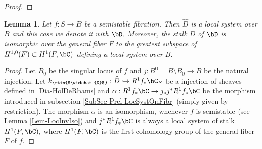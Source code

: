 \documentclass[a4paper,11pt]{amsart}
\newtheorem{lemma}[theorem]{Lemma}
\begin{document}
{\begin{proof}
	\end{proof}	
	\begin{lemma}\label{Lem-cDLocSys} Let $f:S\to B$ be a semistable fibration. Then $\widehat{D}$ is a local system over $B$  and this case we denote it with $\bD.$  Moreover, the stalk $D$ of $\bD$ is isomorphic over the general fiber $F$ to the greatest subspace of $H^{1,0}(F)\subset H^1(F,\bC)$ defining a local system over $B.$
		\end{lemma}
	\begin{proof} Let $B_0$ be the singular locus of $f$ and $j: B^0=B\setminus B_0\to B$ be the natural injection. Let  $k_{\mtin{$\widehat{D}$}}:\widehat{D}\hookrightarrow R^1f_*\bC_S$ be a injection of sheaves defined in \eqref{Dia-HolDeRhams} and  $\alpha:R^1f_*\bC\to j_*j^* R^1f_*\bC $ be the morphism introduced in subsection \ref{SubSec-Prel-LocSystOnFibr} (simply given by restriction). The morphism $\alpha$ is an isomorphism, whenever $f$ is semistable (see Lemma \ref{Lem-LocInvIso}) and $j^* R^1f_*\bC $ is always a local system of stalk $H^1(F,\bC),$ where $H^1(F,\bC)$ is the first cohomology group of the general fiber $F$ of $f.$


\end{proof}}
\end{document}
